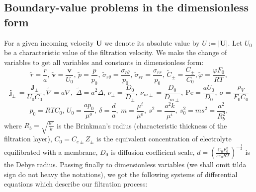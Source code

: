 \documentclass{amsart}
\begin{document}
\subsection{Boundary-value problems in the dimensionless form}
For a given incoming velocity ${\mathbf {U}} $ we denote its absolute value by $U:=|{\mathbf {U}} |.$ Let $U_0$ be a characteristic value of the filtration velocity.
We make the change of variables to get all variables and constants in dimensionless form:
$$\tilde{r}=\frac{r}{a},\,\mathbf{\tilde{v}}=\frac{{\mathbf{v}}}{{U_0}},\,\tilde{p}=\frac{p}{{p}_{0}},\,\widetilde{\sigma}_{r\theta}=\frac{{\sigma}_{r\theta}}{p_0},\,\widetilde{\sigma}_{rr}=\frac{{\sigma}_{rr}}{p_0},\,\widetilde{C}_{\pm}=\frac{C_{\pm}}{C_0},
\widetilde{\varphi}=\frac{\varphi F_0}{RT},$$
$${{\mathbf{j}}_{\pm }}\,=\frac{{{\mathbf{J}}_{\pm }}}{{{U_0}}{{C}_{0}}},\tilde{\nabla }=a\nabla ,\,\,\tilde{\Delta }={{a}^{2}}\Delta ,\, \nu_{\pm}=\frac{D_0}{D_{\pm}},\  \nu_{m\pm}=\frac{D_0}{D_{m\pm}},\ \text{Pe}=\frac{a{{U_0}}}{{{D}_{0}}},\ \sigma=\frac{\rho_V}{F_0 C_0}$$
$${{p}_{0}}=RT{{C}_{0}},\,{{U_0}}=\frac{a p_0}{\mu^o},\ \delta=\frac{d}{a},\ m=\frac{\mu^i}{\mu^o},\ s^2=\frac{a^2k}{\mu^i},\ s_0^2=ms^2=\frac{a^2}{R_b^2},$$
where ${{R}_{b}}=\sqrt{\frac{\mu^o}{k}}$ is the Brinkman's radius (characteristic thickness of the filtration layer), ${{C}_{0}}={{C}_{e\pm }}{{Z}_{\pm }}$ is the equivalent concentration of electrolyte equilibrated with a membrane, ${{D}_{0}}$ is diffusion coefficient scale, $d=\left(\frac{C_0F_0^2}{\varepsilon\varepsilon_0 RT}\right)^{-\frac{1}{2}}$ is the Debye radius.
Passing finally to dimensionless variables  (we shall omit tilda sign do not heavy the notations), we got the following systems of differential equations which describe our filtration process:  \\

\end{document}
